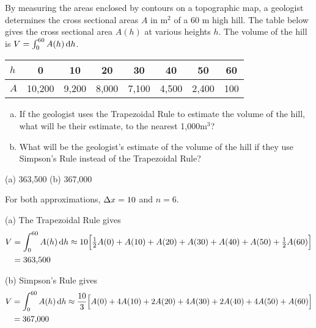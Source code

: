 \begin{Mquestion}[2001A]
By measuring the areas enclosed by contours on a topographic map, a geologist
determines the cross sectional areas $A$ in $\mathrm{m}^2$ of a $60$ m high
hill. The table below gives the cross sectional area $A(h)$ at various
heights $h$. The volume of the hill is $V=\int_0^{60} A(h)\,\mathrm{d}h$.

\renewcommand{\arraystretch}{1.1}
\begin{center}
     \begin{tabular}{|l|c|c|c|c|c|c|c|}
          \hline
          $h$ &0&10&20&30&40&50&60  \\
          \hline
          $A$ &10,200&9,200&8,000&7,100&4,500&2,400&100\\
          \hline
     \end{tabular}
\end{center}
\renewcommand{\arraystretch}{1.0}

\begin{enumerate}[(a)]
\item
If the geologist uses the Trapezoidal Rule to estimate the
volume of the hill, what will be their estimate, to the nearest 1,000$\mathrm{m}^3$?
\item
What will be the geologist's estimate of the volume of the
hill if they use Simpson's Rule instead of the Trapezoidal Rule?
\end{enumerate}
\end{Mquestion}

\begin{answer}
(a) 363,500
\qquad (b) 367,000
\end{answer}

\begin{solution}
For both approximations, $\Delta x = 10$ and $n=6$.

 (a)
The Trapezoidal Rule gives
\begin{align*}
V&=\int_0^{60} A(h)\,\mathrm{d}h
\approx 10\Big[\tfrac{1}{2} A(0)+A(10)+A(20)+A(30)+A(40)+A(50)+\tfrac{1}{2} A(60)\Big] \\
&=\text{363,500}
\end{align*}

\noindent (b)
Simpson's Rule gives
\begin{align*}
V&=\int_0^{60} A(h)\,\mathrm{d}h
\approx \frac{10}{3}\Big[A(0)+4A(10)+2A(20)+4A(30)+2A(40)+4A(50)+A(60)\Big]\\
&=\text{367,000}
\end{align*}

\end{solution}


